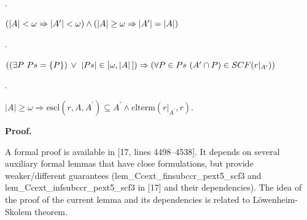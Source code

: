  
\par{}. 
 
$(|A|<\omega\Rightarrow|A^{\prime}|<\omega)\wedge(|A|\geq\omega\Rightarrow|A^{%
\prime}|=|A|)$\par
 
 
 
\par{}. 
 
$((\exists P\leavevmode\nobreak\ Ps=\{P\})\,\vee\leavevmode\nobreak\ |Ps|\in[%
\omega,|A|\,])\Rightarrow(\forall P\in Ps\leavevmode\nobreak\ (A^{\prime}\cap P%
)\in SCF(r|_{A^{\prime}}))$\par
 
 
 
\par{}. 
 
$|A|\geq\omega\Rightarrow\mathrm{escl}(r,A,A^{\prime})\subseteq A^{\prime}%
\wedge\mathrm{clterm}(r|_{A^{\prime}},r)$.\par
 
 
  
 
 
 
\par\medskip\noindent\textbf{Proof.}\par
 
 
A formal proof is available in [17, lines 4498–4538]. It depends on several auxiliary formal lemmas that have close formulations, but provide weaker/different guarantees (lem\_Ccext\_finsubccr\_pext5\_scf3 and lem\_Ccext\_infsubccr\_pext5\_scf3 in [17] and their dependencies). The idea of the proof of the current lemma and its dependencies is related to Löwenheim-Skolem theorem.\par
 
 
 
